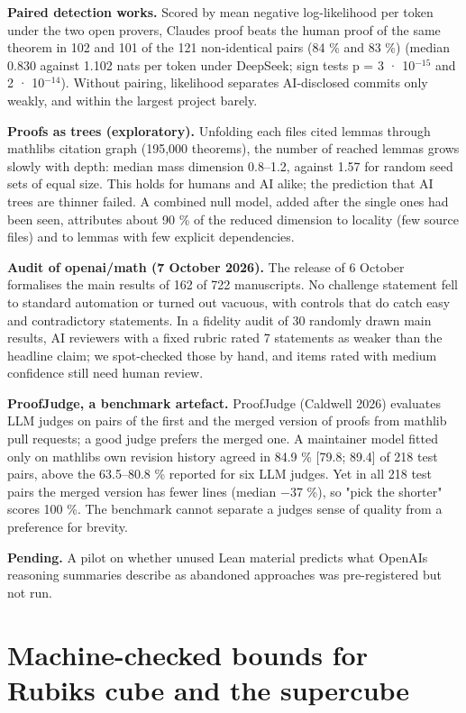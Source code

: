 \documentclass[11pt,a4paper]{article}
\begin{document}
\textbf{Paired detection works.} Scored by mean negative log-likelihood per token under the two open provers, Claude\textquotesingle s proof beats the human proof of the same theorem in 102 and 101 of the 121 non-identical pairs (84 \% and 83 \%) (median 0.830 against 1.102 nats per token under DeepSeek; sign tests p = 3 · 10\(^{-15}\) and 2 · 10\(^{-14}\)). Without pairing, likelihood separates AI-disclosed commits only weakly, and within the largest project barely.

\textbf{Proofs as trees (exploratory).} Unfolding each file\textquotesingle s cited lemmas through mathlib\textquotesingle s citation graph (195,000 theorems), the number of reached lemmas grows slowly with depth: median mass dimension 0.8--1.2, against 1.57 for random seed sets of equal size. This holds for humans and AI alike; the prediction that AI trees are thinner failed. A combined null model, added after the single ones had been seen, attributes about 90 \% of the reduced dimension to locality (few source files) and to lemmas with few explicit dependencies.

\textbf{Audit of openai/math (7 October 2026).} The release of 6 October formalises the main results of 162 of 722 manuscripts. No challenge statement fell to standard automation or turned out vacuous, with controls that do catch easy and contradictory statements. In a fidelity audit of 30 randomly drawn main results, AI reviewers with a fixed rubric rated 7 statements as weaker than the headline claim; we spot-checked those by hand, and items rated with medium confidence still need human review.

\textbf{ProofJudge, a benchmark artefact.} ProofJudge (Caldwell 2026) evaluates LLM judges on pairs of the first and the merged version of proofs from mathlib pull requests; a good judge prefers the merged one. A maintainer model fitted only on mathlib\textquotesingle s own revision history agreed in 84.9 \% {[}79.8; 89.4{]} of 218 test pairs, above the 63.5--80.8 \% reported for six LLM judges. Yet in all 218 test pairs the merged version has fewer lines (median −37 \%), so "pick the shorter" scores 100 \%. The benchmark cannot separate a judge\textquotesingle s sense of quality from a preference for brevity.

\textbf{Pending.} A pilot on whether unused Lean material predicts what OpenAI\textquotesingle s reasoning summaries describe as abandoned approaches was pre-registered but not run.

\section{Machine-checked bounds for Rubik\textquotesingle s cube and the supercube}
\end{document}

